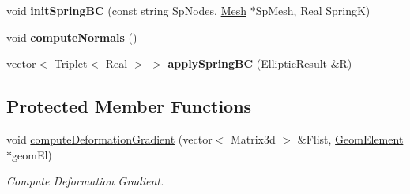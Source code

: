 \begin{DoxyCompactItemize}
\item 
\hypertarget{classvoom_1_1_mechanics_model_af9b1594af982c78afa3f881ea6d6da8a}{
void {\bfseries initSpringBC} (const string SpNodes, \hyperlink{classvoom_1_1_mesh}{Mesh} $\ast$SpMesh, Real SpringK)}
\label{classvoom_1_1_mechanics_model_af9b1594af982c78afa3f881ea6d6da8a}

\item 
\hypertarget{classvoom_1_1_mechanics_model_a9c66d41d4334f8e9b1376aef9136ceda}{
void {\bfseries computeNormals} ()}
\label{classvoom_1_1_mechanics_model_a9c66d41d4334f8e9b1376aef9136ceda}

\item 
\hypertarget{classvoom_1_1_mechanics_model_a10f2985362e2fc641a59a0d3d8a5e5a8}{
vector$<$ Triplet$<$ Real $>$ $>$ {\bfseries applySpringBC} (\hyperlink{structvoom_1_1_elliptic_result}{EllipticResult} \&R)}
\label{classvoom_1_1_mechanics_model_a10f2985362e2fc641a59a0d3d8a5e5a8}

\end{DoxyCompactItemize}
\subsection*{Protected Member Functions}
\begin{DoxyCompactItemize}
\item 
\hypertarget{classvoom_1_1_mechanics_model_aa44a8b08dc23ea0279ed2bf6b78e56f8}{
void \hyperlink{classvoom_1_1_mechanics_model_aa44a8b08dc23ea0279ed2bf6b78e56f8}{computeDeformationGradient} (vector$<$ Matrix3d $>$ \&Flist, \hyperlink{classvoom_1_1_geom_element}{GeomElement} $\ast$geomEl)}
\label{classvoom_1_1_mechanics_model_aa44a8b08dc23ea0279ed2bf6b78e56f8}

\begin{DoxyCompactList}\small\item\em Compute Deformation Gradient. \item\end{DoxyCompactList}\end{DoxyCompactItemize}
